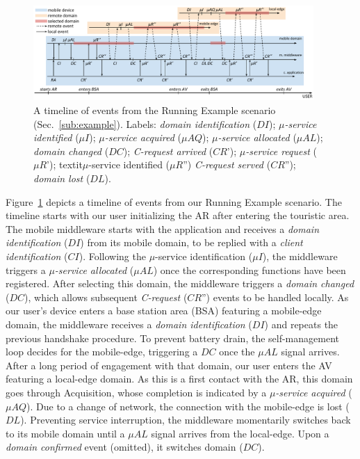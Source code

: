 \begin{figure}[tbp]
	\includegraphics[width=0.95\textwidth]{figs/A3-E-instance-events}
	\caption{A timeline of events from the Running Example scenario (Sec.~\ref{sub:example}). Labels: \textit{domain identification} ($DI$); \textit{$\mu$-service identified} ($\mu I$); \textit{$\mu$-service acquired} ($\mu AQ$); \textit{$\mu$-service allocated} ($\mu AL$); \textit{domain changed} ($DC$); \textit{C-request arrived} ($CR$'); \textit{$\mu$-service request} ($\mu R$'); textit{$\mu$-service identified} ($\mu R$'') \textit{C-request served} ($CR$''); \textit{domain lost} ($DL$).}
	\label{fig:A3-E-instance-events}
\end{figure}

Figure~\ref{fig:A3-E-instance-events} depicts a timeline of events from our Running Example scenario. The timeline starts with our user initializing the AR after entering the touristic area. The mobile middleware starts with the application and receives a \textit{domain identification} ($DI$) from its mobile domain, to be replied with a \textit{client identification} ($CI$). Following the $\mu$-service identification ($\mu I$), the middleware triggers a \textit{$\mu$-service allocated} ($\mu AL$) once the corresponding functions have been registered. After selecting this domain, the middleware triggers a \textit{domain changed} ($DC$), which allows subsequent \textit{C-request} ($CR$'') events to be handled locally. As our user's device enters a base station area (BSA) featuring a mobile-edge domain, the middleware receives a \textit{domain identification} ($DI$) and repeats the previous handshake procedure. To prevent battery drain, the self-management loop decides for the mobile-edge, triggering a $DC$ once the $\mu AL$ signal arrives. After a long period of engagement with that domain, our user enters the AV featuring a local-edge domain. As this is a first contact with the AR, this domain goes through Acquisition, whose completion is indicated by a \textit{$\mu$-service acquired} ($\mu AQ$). Due to a change of network, the connection with the mobile-edge is lost ($DL$). Preventing service interruption, the middleware momentarily switches back to its mobile domain until a $\mu AL$ signal arrives from the local-edge. Upon a \textit{domain confirmed} event (omitted), it switches domain ($DC$). 

